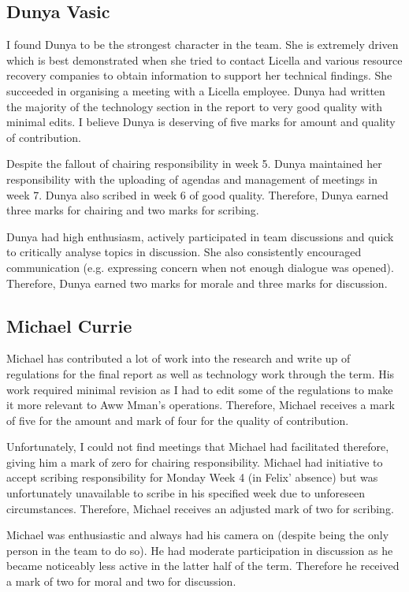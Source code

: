 \documentclass[11pt, a4, nocenter, margin=150mm]{article}
\begin{document}
	\subsection{Dunya Vasic}

	I found Dunya to be the strongest character in the team. She is extremely driven which is best demonstrated when she tried to contact Licella and various resource recovery companies to obtain information to support her technical findings. She succeeded in organising a meeting with a Licella employee. Dunya had written the majority of the technology section in the report to very good quality with minimal edits. I believe Dunya is deserving of five marks for amount and quality of contribution.

	Despite the fallout of chairing responsibility in week 5. Dunya maintained her responsibility with the uploading of agendas and management of meetings in week 7. Dunya also scribed in week 6 of good quality. Therefore, Dunya earned three marks for chairing and two marks for scribing.

	Dunya had high enthusiasm, actively participated in team discussions and quick to critically analyse topics in discussion. She also consistently encouraged communication (e.g. expressing concern when not enough dialogue was opened). Therefore, Dunya earned two marks for morale and three marks for discussion.

	\subsection{Michael Currie}

	Michael has contributed a lot of work into the research and write up of regulations for the final report as well as technology work through the term. His work required minimal revision as I had to edit some of the regulations to make it more relevant to Aww Mman's operations. Therefore, Michael receives a mark of five for the amount and mark of four for the quality of contribution.

	Unfortunately, I could not find meetings that Michael had facilitated therefore, giving him a mark of zero for chairing responsibility. Michael had initiative to accept scribing responsibility for Monday Week 4 (in Felix' absence) but was unfortunately unavailable to scribe in his specified week due to unforeseen circumstances. Therefore, Michael receives an adjusted mark of two for scribing.

	Michael was enthusiastic and always had his camera on (despite being the only person in the team to do so). He had moderate participation in discussion as he became noticeably less active in the latter half of the term. Therefore he received a mark of two for moral and two for discussion.
	
\end{document}

